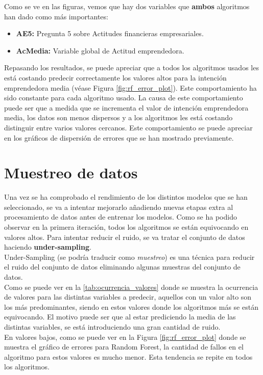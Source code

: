 Como se ve en las figuras, vemos que hay dos variables que \textbf{ambos} algoritmos han dado como más importantes:
\begin{itemize}
	\item\textbf{AE5:} Pregunta  5 sobre Actitudes financieras empresariales.
	\item\textbf{AcMedia:} Variable global de Actitud emprendedora.
\end{itemize}
Repasando los resultados, se puede apreciar que a todos los algoritmos usados les está costando predecir correctamente los valores altos para la intención emprendedora media (véase Figura \ref{fig:rf_error_plot}). Este comportamiento ha sido constante para cada algoritmo usado. La causa de este comportamiento puede ser que a medida que se incrementa el valor de intención emprendedora media, los datos son menos dispersos y a los algoritmos les está costando distinguir entre varios valores cercanos. Este comportamiento se puede apreciar en los gráficos de dispersión de errores que se han mostrado previamente.
\pagebreak
\section{Muestreo de datos}
Una vez se ha comprobado el rendimiento de los distintos modelos que se han seleccionado, se va a intentar mejorarlo añadiendo nuevas etapas extra al procesamiento de datos antes de entrenar los modelos.
\newline
Como se ha podido observar en la primera iteración, todos los algoritmos se están equivocando en valores altos. Para intentar reducir el ruido, se va tratar el conjunto de datos haciendo \textbf{under-sampling}.\\
Under-Sampling (se podría traducir como \textit{muestreo}) es una técnica para reducir el ruido del conjunto de datos eliminando algunas muestras del conjunto de datos.\\
\linebreak
Como se puede ver en la \ref{tab:ocurrencia_valores} donde se muestra la ocurrencia de valores para las distintas variables a predecir,  aquellos con un valor alto son los más predominantes, siendo en estos valores donde los algoritmos más se están equivocando. El motivo puede ser que al estar prediciendo la media de las distintas variables, se está introduciendo una gran cantidad de ruido. \\
En valores bajos, como se puede ver en la Figura \ref{fig:rf_error_plot} donde se muestra el gráfico de errores para Random Forest, la cantidad de fallos en el algoritmo para estos valores es mucho menor. Esta tendencia se repite en todos los algoritmos.\\
